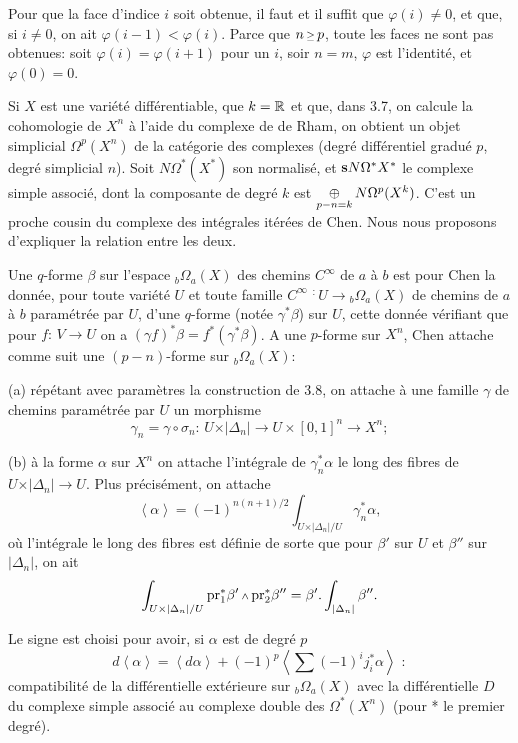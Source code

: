 Pour que la face d'indice $i$ soit obtenue, il
faut et il suffit que $\varphi(i)\not=0$, et
que, si $i\not=0$, on ait
$\varphi(i-1)<\varphi(i)$.
Parce que $n\Ge p$, toute les faces ne sont
pas obtenues: soit $\varphi(i)=\varphi(i+1)$
pour un $i$, soir $n=m$, $\varphi$ est
l'identit\'e, et $\varphi(0)=0$.
\enddemo

\endsubhead
Si $X$ est une vari\'et\'e diff\'erentiable,
que $k={\Bbb R}$ et que, dans 3.7, on calcule la
cohomologie de $X^n$ \`a l'aide du complexe de
de Rham, on obtient un objet simplicial
$\Omega^p(X^n)$ de la cat\'egorie des
complexes (degr\'e diff\'erentiel gradu\'e $p$,
degr\'e simplicial $n$).
Soit $N\Omega^*(X^*)$ son normalis\'e, et
$\bold{s} N\Omega^*X^*$ le complexe simple
associ\'e, dont la composante de degr\'e $k$
est $\oplusop_{p-n=k}N\Omega^p(X^k)$.
C'est un proche cousin du complexe des
int\'egrales it\'er\'ees de Chen.
Nous nous proposons d'expliquer la relation
entre les deux.

Une $q$-forme $\beta$ sur l'espace
${}_b\Omega_a(X)$ des chemins $C^\infty$ de
$a$ \`a $b$ est pour Chen la donn\'ee, pour
toute vari\'et\'e $U$ et toute famille
$C^\infty$ $^\colon\, U\to {}_b\Omega_a(X)$
de chemins de $a$ \`a $b$ param\'etr\'ee par
$U$, d'une $q$-forme (not\'ee
$\gamma^*\beta$) sur $U$, cette donn\'ee
v\'erifiant que pour $f\colon\, V\to U$ on
a $(\gamma f)^*\beta=f^*(\gamma^*\beta)$.
A une $p$-forme sur $X^n$, Chen attache comme
suit une $(p-n)$-forme sur ${}_b\Omega_a(X)$:

\medskip\noindent
{\sans (a)}\enspace
r\'ep\'etant avec param\`etres la construction
de 3.8, on attache \`a une famille $\gamma$ de
chemins param\'etr\'ee par $U$ un morphisme
$$
\gamma_n=\gamma\circ\sigma_n\colon\,
U\times\vert\Delta_n\vert\to
U\times[0,1]^n\to X^n;
$$

\noindent
{\sans (b)}\enspace
\`a la forme $\alpha$ sur $X^n$ on attache
l'int\'egrale de $\gamma_n^*\alpha$ le long
des fibres de $U\times\vert\Delta_n\vert\to U$.
Plus pr\'ecis\'ement, on attache
$$
\left<\alpha\right>=(-1)^{n(n+1)/2}\int_{U\times
\vert\Delta_n\vert/U}\gamma_n^*\alpha,
$$
o\`u l'int\'egrale le long des fibres est
d\'efinie de sorte que pour $\beta'$ sur
$U$ et $\beta''$ sur $\vert\Delta_n\vert$,
on ait 
$$
\int_{U\times\vert\Delta_n\vert/U}
\pr_1^*\beta'\w \pr_2^*\beta''=\beta'.
\int_{\vert\Delta_n\vert}\beta''.
$$

Le signe est choisi pour avoir, si $\alpha$
est de degr\'e $p$
$$
d\left<\alpha\right>=\left<d\alpha\right>+
(-1)^p\left<\sum(-1)^ij_i^*\alpha\right>\,\,:
$$
compatibilit\'e de la diff\'erentielle
ext\'erieure sur ${}_b\Omega_a(X)$ avec la
diff\'erentielle $D$ du complexe simple
associ\'e au complexe double des
$\Omega^*(X^n)$ (pour * le premier degr\'e).

